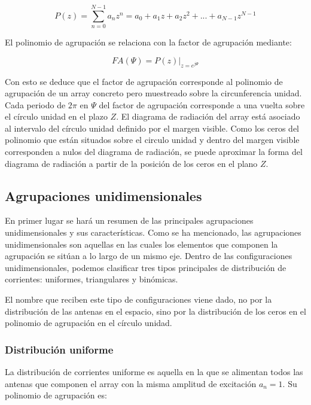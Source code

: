 \begin{equation}
	P(z)=\sum_{n=0}^{N-1}a_{n}z^{n}=a_{0}+a_{1}z+a_{2}z^{2}+...+a_{N-1}z^{N-1}
	\label{eq:z}
\end{equation}

\par El polinomio de agrupación se relaciona con la factor de agrupación mediante:


\begin{equation}
	FA(\Psi)=P(z)|_{z=e^{j\Psi}}
	\label{eq:faz}
\end{equation}

\par Con esto se deduce que el factor de agrupación corresponde al polinomio de agrupación de un array concreto pero muestreado sobre la circunferencia unidad. Cada periodo de $2\pi$ en $\Psi$ del factor de agrupación corresponde a una vuelta sobre el círculo unidad en el plazo $Z$. El diagrama de radiación del array está asociado al intervalo del círculo unidad definido por el margen visible. Como los ceros del polinomio que están situados sobre el circulo unidad  y dentro del margen visible corresponden a nulos del diagrama de radiación, se puede aproximar la forma del diagrama de radiación a partir de la posición de los ceros en el plano $Z$. \cite{Cardama2002}

\subsection{Agrupaciones unidimensionales}
\par En primer lugar se hará un resumen de las principales agrupaciones unidimensionales y sus características. Como se ha mencionado, las agrupaciones unidimensionales son aquellas en las cuales los elementos que componen la agrupación se sitúan a lo largo de un mismo eje. Dentro de las configuraciones unidimensionales, podemos clasificar tres tipos principales de distribución de corrientes: uniformes, triangulares y binómicas. \cite{Cardama2002}
\\
\par El nombre que reciben este tipo de configuraciones viene dado, no por la distribución de las antenas en el espacio, sino por la distribución de los ceros en el polinomio de agrupación en el círculo unidad.

\subsubsection{Distribución uniforme}
\par La distribución de corrientes uniforme es aquella en la que se alimentan todos las antenas que componen el array con la misma amplitud de excitación $a_{n}=1$. Su polinomio de agrupación es:


